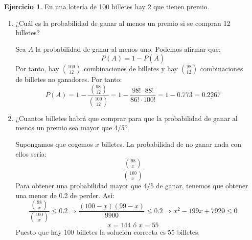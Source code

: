\documentclass[a4paper, 12pt]{article}
\theoremstyle{definition}
\newtheorem{ej}{Ejercicio}
\begin{document}
\begin{ej}
En una lotería de 100 billetes hay 2 que tienen premio.

\begin{enumerate}[label=\textit{\alph*)}]
	\item ¿Cuál es la probabilidad de ganar al menos un premio si se compran 12 billetes?
	
	Sea \(A\) la probabilidad de ganar al menos uno. Podemos afirmar que:
\[
	P(A) = 1 - P(\bar{A})
\]
Por tanto, hay \(\binom{100}{12}\) combinaciones de billetes y hay \(\binom{98}{12}\) combinaciones de billetes no ganadores. Por tanto:
\[
	P(A) = 1 - \frac{\binom{98}{12}}{\binom{100}{12}} = 1 - \frac{98! \cdot 88!}{86! \cdot 100!} = 1 - 0.773 = \underline{0.2267}
\]

	\item ¿Cuantos billetes habrá que comprar para que la probabilidad de ganar al menos un premio sea mayor que 4/5?

Supongamos que cogemos \(x\) billetes. La probabilidad de no ganar nada con ellos sería:
\[
	\frac{\binom{98}{x}}{\binom{100}{x}}
\]
Para obtener una probabilidad mayor que 4/5 de ganar, tenemos que obtener una menor de 0.2 de perder. Así:
\[
	\frac{\binom{98}{x}}{\binom{100}{x}} \leq 0.2 \Rightarrow \frac{(100-x) (99-x)}{9900} \leq 0.2 \Rightarrow x^2 - 199x + 7920 \leq 0
\]
\[
	x = 144 \text{ ó } x = 55
\]
Puesto que hay 100 billetes la solución correcta es 55 billetes.
\end{enumerate}
\end{ej}
\end{document}
